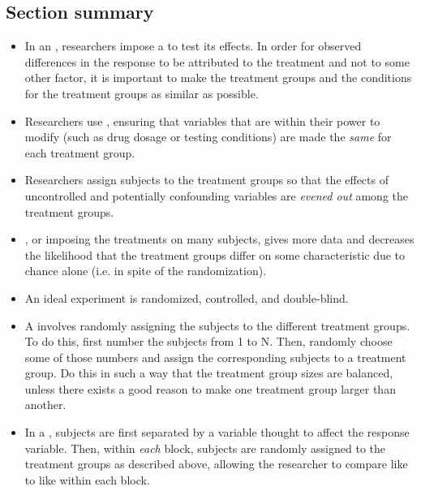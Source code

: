 \D{\newpage}

\subsection*{Section summary}

\begin{itemize}
\item In an , researchers impose a  to test its effects.  In order for observed differences in the response to be attributed to the treatment and not to some other factor, it is important to make the treatment groups and the conditions for the treatment groups as similar as possible.

\item Researchers use , ensuring that variables that are within their power to modify (such as drug dosage or testing conditions) are made the \textit{same} for each treatment group.  

\item Researchers  assign subjects to the treatment groups so that the effects of uncontrolled and potentially confounding variables are \textit{evened out} among the treatment groups.

\item {}, or imposing the treatments on many subjects, gives more data and decreases the likelihood that the treatment groups differ on some characteristic due to chance alone (i.e. in spite of the randomization).  

\item An ideal experiment is randomized, controlled, and double-blind.  

\item A  involves randomly assigning the subjects to the different treatment groups.  To do this, first number the subjects from 1 to N.  Then, randomly choose some of those numbers and assign the corresponding subjects to a treatment group.  Do this in such a way that the treatment group sizes are balanced, unless there exists a good reason to make one treatment group larger than another.

\item In a , subjects are first separated by a variable thought to affect the response variable.  Then, within \textit{each} block, subjects are randomly assigned to the treatment groups as described above, allowing the researcher to compare like to like within each block. 


\end{itemize}

